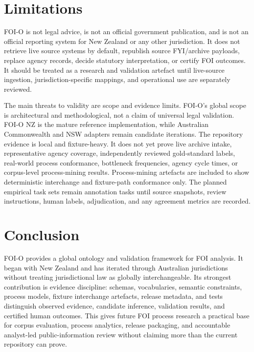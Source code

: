 \documentclass[
]{article}
\begin{document}
\section{Limitations}\label{limitations}

FOI-O is not legal advice, is not an official government publication,
and is not an official reporting system for New Zealand or any other
jurisdiction. It does not retrieve live source systems by default,
republish source FYI/archive payloads, replace agency records, decide
statutory interpretation, or certify FOI outcomes. It should be treated
as a research and validation artefact until live-source ingestion,
jurisdiction-specific mappings, and operational use are separately
reviewed.

The main threats to validity are scope and evidence limits. FOI-O's
global scope is architectural and methodological, not a claim of
universal legal validation. FOI-O NZ is the mature reference
implementation, while Australian Commonwealth and NSW adapters remain
candidate iterations. The repository evidence is local and
fixture-heavy. It does not yet prove live archive intake, representative
agency coverage, independently reviewed gold-standard labels, real-world
process conformance, bottleneck frequencies, agency cycle times, or
corpus-level process-mining results. Process-mining artefacts are
included to show deterministic interchange and fixture-path conformance
only. The planned empirical task sets remain annotation tasks until
source snapshots, review instructions, human labels, adjudication, and
any agreement metrics are recorded.

\section{Conclusion}\label{conclusion}

FOI-O provides a global ontology and validation framework for FOI
analysis. It began with New Zealand and has iterated through Australian
jurisdictions without treating jurisdictional law as globally
interchangeable. Its strongest contribution is evidence discipline:
schemas, vocabularies, semantic constraints, process models, fixture
interchange artefacts, release metadata, and tests distinguish observed
evidence, candidate inference, validation results, and certified human
outcomes. This gives future FOI process research a practical base for
corpus evaluation, process analytics, release packaging, and accountable
analyst-led public-information review without claiming more than the
current repository can prove.
\end{document}

